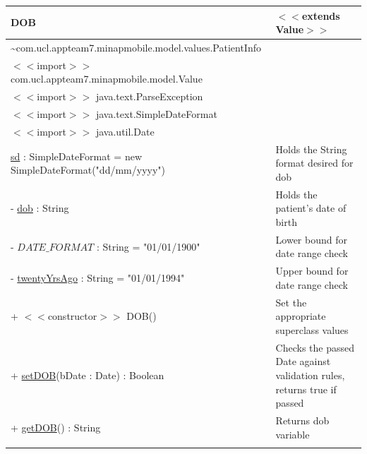 \documentclass[12pt,a4paper,oneside,titlepage]{article}
\begin{document}
\begin{center}
	\begin{tabular}{| p{13cm} | p{5cm} |}
	\hline
	\textbf{DOB} & \textbf{$<<$extends Value$>>$} \\ \hline
	\textasciitilde com.ucl.appteam7.minapmobile.model.values.PatientInfo & \\ \hline
	$<<$import$>>$ com.ucl.appteam7.minapmobile.model.Value & \\ \hline
	$<<$import$>>$ java.text.ParseException & \\ \hline
	$<<$import$>>$ java.text.SimpleDateFormat & \\ \hline
	$<<$import$>>$ java.util.Date & \\ \hline \hline
	\underline{sd} : SimpleDateFormat = new SimpleDateFormat("dd/mm/yyyy") & Holds the String format desired for dob \\ \hline
	- \underline{dob} : String & Holds the patient's date of birth \\ \hline
	- \underline{$DATE\_FORMAT$} : String = "01/01/1900" & Lower bound for date range check \\ \hline
	- \underline{twentyYrsAgo} : String = "01/01/1994" & Upper bound for date range check \\ \hline \hline
	+ $<<$constructor$>>$ DOB() & Set the appropriate superclass values \\ \hline
	+ \underline{setDOB}(bDate : Date) : Boolean & Checks the passed Date against validation rules, returns true if passed \\ \hline
	+ \underline{getDOB}() : String & Returns dob variable \\&\\ \hline
	\end{tabular}
\end{center}
\end{document}
